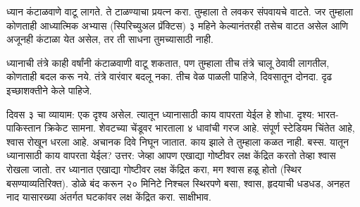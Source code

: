 ध्यान कंटाळवाणे वाटू लागते. ते टाळण्याचा प्रयत्न करा. तुम्हाला ते लवकर संपवायचे वाटते. जर तुम्हाला कोणताही आध्यात्मिक अभ्यास (स्पिरिच्युअल प्रॅक्टिस) ३ महिने केल्यानंतरही तसेच वाटत असेल आणि अजूनही कंटाळा येत असेल, तर ती साधना तुमच्यासाठी नाही.

ध्यानाची तंत्रे काही वर्षांनी कंटाळवाणी वाटू शकतात, पण तुम्हाला तीच तंत्रे चालू ठेवावी लागतील, कोणताही बदल करू नये. तंत्रे वारंवार बदलू नका. तीच वेळ पाळली पाहिजे, दिवसातून दोनदा. दृढ इच्छाशक्तीने केले पाहिजे.

दिवस ३ चा व्यायाम:
एक दृश्य असेल. त्यातून ध्यानासाठी काय वापरता येईल हे शोधा. दृश्य: भारत-पाकिस्तान क्रिकेट सामना. शेवटच्या चेंडूवर भारताला ४ धावांची गरज आहे. संपूर्ण स्टेडियम चिंतेत आहे, श्वास रोखून धरला आहे. अचानक दिवे निघून जातात. काय झाले ते तुम्हाला कळत नाही. बस्स. यातून ध्यानासाठी काय वापरता येईल?
उत्तर: जेव्हा आपण एखाद्या गोष्टीवर लक्ष केंद्रित करतो तेव्हा श्वास रोखला जातो. तर ध्यानात एखाद्या गोष्टीवर लक्ष केंद्रित करा, मग श्वास हळू होतो (स्थिर बसण्याव्यतिरिक्त). डोळे बंद करून २० मिनिटे निश्चल स्थिरपणे बसा, श्वास, हृदयाची धडधड, अनहत नाद यासारख्या अंतर्गत घटकांवर लक्ष केंद्रित करा. साक्षीभाव.


